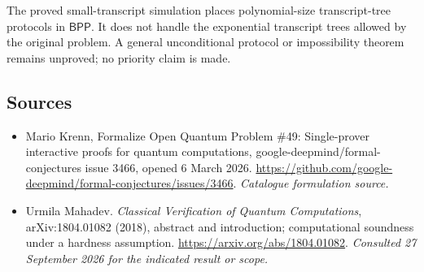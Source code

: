 \documentclass[11pt,a4paper]{article}
\numberwithin{equation}{section}
\begin{document}
The proved small-transcript simulation places polynomial-size transcript-tree
protocols in $\mathsf{BPP}$.  It does not handle the exponential transcript
trees allowed by the original problem.  A general unconditional protocol
or impossibility theorem remains unproved; no priority claim is made.
\subsection{Sources}
\begin{itemize}\raggedright
\item[\textnormal{[S1]}]\hypertarget{source:30006741:1}{} Mario Krenn, Formalize Open Quantum Problem \#49: Single-prover interactive proofs for quantum computations, google-deepmind/formal-conjectures issue 3466, opened 6 March 2026.
\url{https://github.com/google-deepmind/formal-conjectures/issues/3466}.
{\small\textit{Catalogue formulation source.}}
\item[\textnormal{[E1]}]\hypertarget{extra:30006741:1}{} Urmila Mahadev.
\emph{Classical Verification of Quantum Computations}, arXiv:1804.01082 (2018), abstract and introduction; computational soundness under a hardness assumption.
\url{https://arxiv.org/abs/1804.01082}.
{\small\textit{Consulted 27 September 2026 for the indicated result or scope.}}
\end{itemize}
\end{document}
